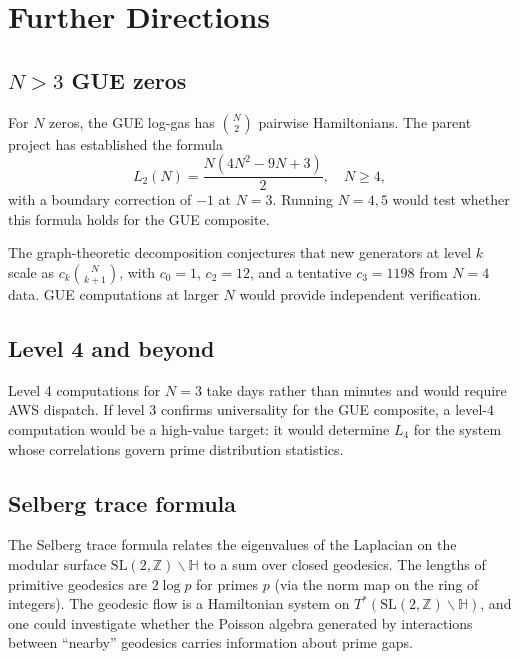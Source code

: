 \documentclass[11pt,a4paper]{article}
\newcommand{\Z}{\mathbb{Z}}
\begin{document}
\section{Further Directions}
\label{sec:further}

\subsection{$N > 3$ GUE zeros}

For $N$ zeros, the GUE log-gas has $\binom{N}{2}$ pairwise Hamiltonians.
The parent project has established the formula
\begin{equation}\label{eq:L2}
  L_2(N) = \frac{N(4N^2 - 9N + 3)}{2}, \quad N \ge 4,
\end{equation}
with a boundary correction of $-1$ at $N = 3$.  Running $N = 4, 5$
would test whether this formula holds for the GUE composite.

The graph-theoretic decomposition conjectures that new generators at
level $k$ scale as $c_k \binom{N}{k+1}$, with $c_0 = 1$,
$c_2 = 12$, and a tentative $c_3 = 1198$ from $N = 4$ data. GUE
computations at larger $N$ would provide independent verification.

\subsection{Level 4 and beyond}

Level 4 computations for $N = 3$ take days rather than minutes and
would require AWS dispatch. If level 3 confirms universality for the
GUE composite, a level-4 computation would be a high-value target:
it would determine $L_4$ for the system whose correlations govern
prime distribution statistics.

\subsection{Selberg trace formula}

The Selberg trace formula relates the eigenvalues of the Laplacian on the
modular surface $\mathrm{SL}(2, \Z) \backslash \mathbb{H}$ to a sum over
closed geodesics. The lengths of primitive geodesics are $2\log p$ for
primes $p$ (via the norm map on the ring of integers). The geodesic flow
is a Hamiltonian system on $T^*(\mathrm{SL}(2,\Z)\backslash\mathbb{H})$,
and one could investigate whether the Poisson algebra generated by
interactions between ``nearby'' geodesics carries information about
prime gaps.
\end{document}
